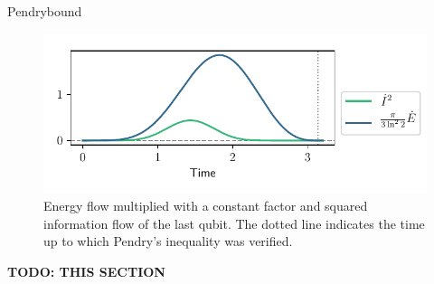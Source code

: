 \documentclass{book}
\numberwithin{equation}{section} %
\begin{document}
Pendrybound
\begin{figure}[H]
    \centering
    \includegraphics{alltheplots/bell/pendry_grey_lines.pdf}
    \caption{Energy flow multiplied with a constant factor and squared information flow of the last qubit. The dotted line
    indicates the time up to which Pendry's inequality \cite{BA_Pendry_1983} was verified.}
    \label{fig:bell_pendry}
\end{figure}
\textbf{TODO: THIS SECTION}
\end{document}
